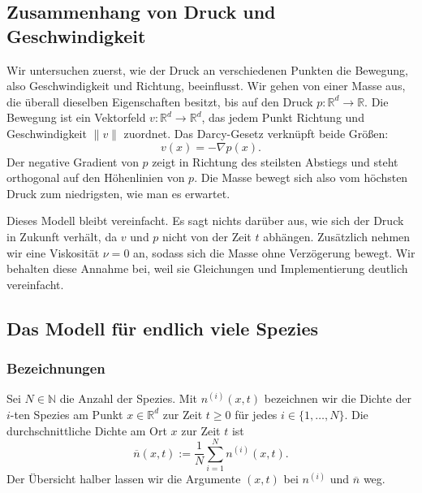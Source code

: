 \documentclass[11pt]{article}
\newcommand{\nbar}{\overline{n}}
\begin{document}
\subsection{Zusammenhang von Druck und Geschwindigkeit}
Wir untersuchen zuerst, wie der Druck an verschiedenen Punkten die Bewegung, also
Geschwindigkeit und Richtung, beeinflusst. Wir gehen von einer Masse aus, die
überall dieselben Eigenschaften besitzt, bis auf den Druck $p \colon \mathbb{R}^d
\to \mathbb{R}$. Die Bewegung ist ein Vektorfeld $v \colon \mathbb{R}^d \to
\mathbb{R}^d$, das jedem Punkt Richtung und Geschwindigkeit $\lVert v \rVert$
zuordnet. Das Darcy-Gesetz verknüpft beide Größen:
\begin{equation}
    v(x) = -\nabla p(x).
\end{equation}
Der negative Gradient von $p$ zeigt in Richtung des steilsten Abstiegs und steht
orthogonal auf den Höhenlinien von $p$. Die Masse bewegt sich also vom höchsten
Druck zum niedrigsten, wie man es erwartet.

Dieses Modell bleibt vereinfacht. Es sagt nichts darüber aus, wie sich der Druck
in Zukunft verhält, da $v$ und $p$ nicht von der Zeit $t$ abhängen. Zusätzlich
nehmen wir eine Viskosität $\nu = 0$ an, sodass sich die Masse ohne Verzögerung
bewegt. Wir behalten diese Annahme bei, weil sie Gleichungen und Implementierung
deutlich vereinfacht.

\subsection{Das Modell für endlich viele Spezies}
\subsubsection{Bezeichnungen}
Sei $N \in \mathbb{N}$ die Anzahl der Spezies. Mit $n^{(i)}(x, t)$ bezeichnen wir
die Dichte der $i$-ten Spezies am Punkt $x \in \mathbb{R}^d$ zur Zeit $t \ge 0$
für jedes $i \in \{1, \dots, N\}$. Die durchschnittliche Dichte am Ort $x$ zur
Zeit $t$ ist
\begin{equation}
    \nbar(x, t) := \frac{1}{N} \sum_{i=1}^{N} n^{(i)}(x, t).
\end{equation}
Der Übersicht halber lassen wir die Argumente $(x, t)$ bei $n^{(i)}$ und $\nbar$
weg.
\end{document}
